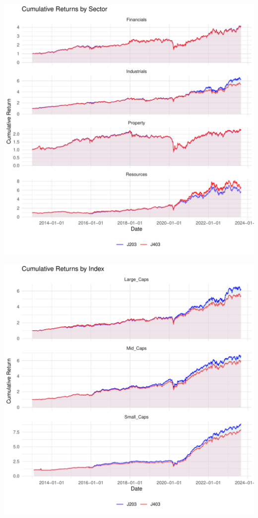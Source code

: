 \documentclass[11pt,preprint, authoryear]{elsarticle}
\let\origfigure\figure
\let\endorigfigure\endfigure
\renewenvironment{figure}[1][2] {
    \expandafter\origfigure\expandafter[H]
} {
    \endorigfigure
}
\numberwithin{equation}{section}
\numberwithin{figure}{section}
\numberwithin{table}{section}
\begin{document}
\begin{figure}[H]

{\centering \includegraphics{Question3_files/figure-latex/Figure1-1} 

}

\caption{Cumulative Returns by Sector}\label{fig:Figure1}
\end{figure}

\begin{figure}[H]

{\centering \includegraphics{Question3_files/figure-latex/Figure1.2-1} 

}

\caption{Cumulative Returns by Index}\label{fig:Figure1.2}
\end{figure}
\end{document}
